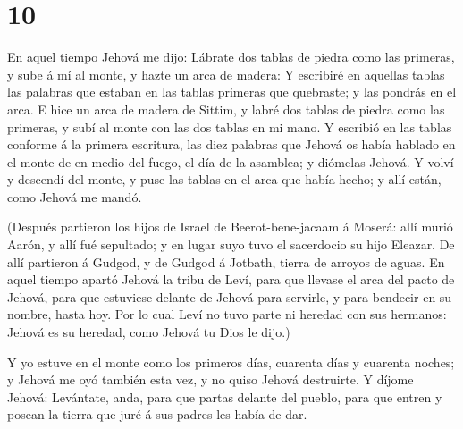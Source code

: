 \hypertarget{section-9}{%
\section{10}\label{section-9}}

 En aquel tiempo Jehová me dijo: Lábrate dos tablas de
piedra como las primeras, y sube á mí al monte, y hazte un arca de
madera:  Y escribiré en aquellas tablas las palabras que
estaban en las tablas primeras que quebraste; y las pondrás en el arca.
 E hice un arca de madera de Sittim, y labré dos tablas de
piedra como las primeras, y subí al monte con las dos tablas en mi mano.
 Y escribió en las tablas conforme á la primera escritura,
las diez palabras que Jehová os había hablado en el monte de en medio
del fuego, el día de la asamblea; y diómelas Jehová.  Y
volví y descendí del monte, y puse las tablas en el arca que había
hecho; y allí están, como Jehová me mandó.

 (Después partieron los hijos de Israel de
Beerot-bene-jacaam á Moserá: allí murió Aarón, y allí fué sepultado; y
en lugar suyo tuvo el sacerdocio su hijo Eleazar.  De allí
partieron á Gudgod, y de Gudgod á Jotbath, tierra de arroyos de aguas.
 En aquel tiempo apartó Jehová la tribu de Leví, para que
llevase el arca del pacto de Jehová, para que estuviese delante de
Jehová para servirle, y para bendecir en su nombre, hasta hoy.
 Por lo cual Leví no tuvo parte ni heredad con sus hermanos:
Jehová es su heredad, como Jehová tu Dios le dijo.)

 Y yo estuve en el monte como los primeros días, cuarenta
días y cuarenta noches; y Jehová me oyó también esta vez, y no quiso
Jehová destruirte.  Y díjome Jehová: Levántate, anda, para
que partas delante del pueblo, para que entren y posean la tierra que
juré á sus padres les había de dar.

